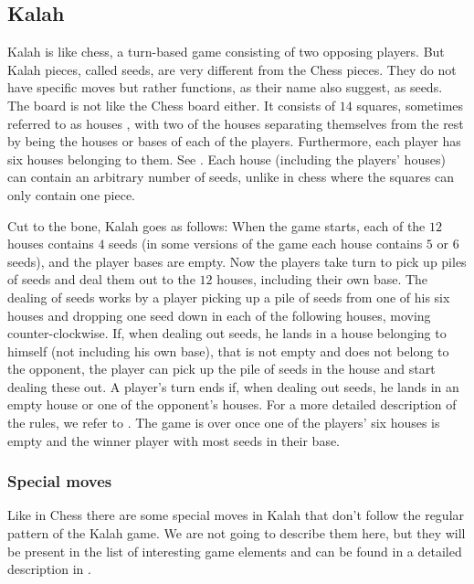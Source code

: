 \subsection{Kalah}

Kalah is like chess, a turn-based game consisting of two opposing
players. But Kalah pieces, called seeds, are very different from the
Chess pieces. They do not have specific moves but rather functions,
as their name also suggest, as seeds. The board is not like the Chess
board either. It consists of $14$ squares, sometimes referred to as houses
\cite{kalahrules}, with two of the houses separating themselves from the
rest by being the houses or bases of each of the players. Furthermore,
each player has six houses belonging to them. See .
Each house (including the players' houses) can contain an arbitrary
number of seeds, unlike in chess where the squares can only contain one
piece.

Cut to the bone, Kalah goes as follows: When the game starts, each
of the $12$ houses contains $4$ seeds (in some versions of the game
each house contains $5$ or $6$ seeds), and the player bases are empty.
Now the players take turn to pick up piles of seeds and deal them out
to the $12$ houses, including their own base. The dealing of seeds
works by a player picking up a pile of seeds from one of his six houses
and dropping one seed down in each of the following houses, moving
counter-clockwise. If, when dealing out seeds, he lands in a house
belonging to himself (not including his own base), that is not empty
and does not belong to the opponent, the player can pick up the pile of
seeds in the house and start dealing these out. A player's turn ends
if, when dealing out seeds, he lands in an empty house or one of the
opponent's houses. For a more detailed description of the rules, we
refer to \cite{kalahrules}. The game is over once one of the players'
six houses is empty and the winner player with most seeds in their base.


\subsubsection{Special moves}
Like in Chess there are some special moves in Kalah that don't follow the
regular pattern of the Kalah game. We are not going to describe them here, but
they will be present in the list of interesting game elements and can be found
in a detailed description in \cite{kalahrules}.

